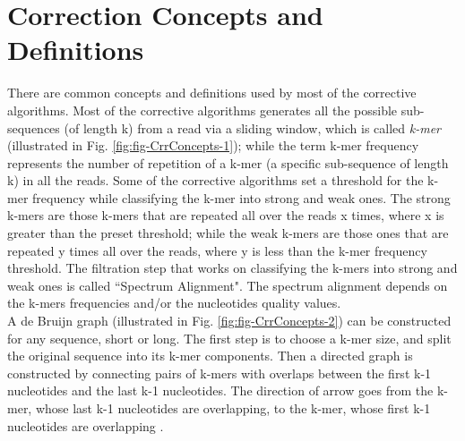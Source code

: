 \documentclass[12pt,openany]{llncs}
\begin{document}
\section{Correction Concepts and Definitions}
There are common concepts and definitions used by most of the corrective algorithms. Most of the corrective algorithms generates all the possible sub-sequences (of length k) from a read via a sliding window, which is called \textit{k-mer} (illustrated in Fig. \ref{fig:fig-CrrConcepts-1}); while the term k-mer frequency represents the number of repetition of a k-mer (a specific sub-sequence of length k) in all the reads. Some of the corrective algorithms set a threshold for the k-mer frequency while classifying the k-mer into strong and weak ones. The strong k-mers are those k-mers that are repeated all over the reads x times, where x is greater than the preset threshold; while the weak k-mers are those ones that are repeated y times all over the reads, where y is less than the k-mer frequency threshold. The filtration step that works on classifying the k-mers into strong and weak ones is called ``Spectrum Alignment". The spectrum alignment depends on the k-mers frequencies and/or the nucleotides quality values.
\\
A de Bruijn graph (illustrated in Fig. \ref{fig:fig-CrrConcepts-2}) can be constructed for any sequence, short or long. The first step is to choose a k-mer size, and split the original sequence into its k-mer components. Then a directed graph is constructed by connecting pairs of k-mers with overlaps between the first k-1 nucleotides and the last k-1 nucleotides. The direction of arrow goes from the k-mer, whose last k-1 nucleotides are overlapping, to the k-mer, whose first k-1 nucleotides are overlapping \cite{deBruijn,deBruijn1}.
\end{document}
